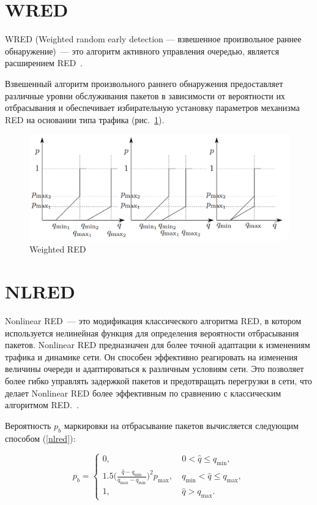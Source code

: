 \section{WRED}

WRED (Weighted random early detection --- взвешенное произвольное раннее
обнаружение)~--- это алгоритм активного управления очередью, является
расширением RED~\citep{WRED}.

Взвешенный алгоритм произвольного раннего обнаружения предоставляет
различные уровни обслуживания пакетов в зависимости от вероятности их
отбрасывания и обеспечивает избирательную установку параметров
механизма RED на основании типа трафика (рис.~\ref{fig:2.3}).

\begin{figure}[!h]
  \centering
  \includegraphics[width=0.7\linewidth]{image/wred.png}
  \caption{Weighted RED}
  \label{fig:2.3}
\end{figure}

\section{NLRED}

Nonlinear RED~--- это модификация классического алгоритма RED, в
котором используется нелинейная функция для определения
вероятности отбрасывания пакетов. Nonlinear RED предназначен для более точной адаптации к изменениям трафика и динамике сети. 
Он способен эффективно реагировать на изменения величины очереди и адаптироваться к различным условиям сети. 
Это позволяет более гибко управлять задержкой пакетов и предотвращать перегрузки в сети, 
что делает Nonlinear RED более эффективным по сравнению с классическим алгоритмом RED.~\citep{NLRED1,NLRED2}.   


Вероятность $p_{b}$ маркировки на
отбрасывание пакетов вычисляется следующим способом (\ref{nlred}):

\begin{equation}
\label{nlred}
p_{b} = \begin{cases}
        0, &  \ 0 < \hat{q} \leqslant q_{\min},
        \\
        1.5({\frac{\hat{q} - q_{\min}}{q_{\max} - q_{\min}})^2} {p_{\max}}, & \ q_{\min} < \hat{q} \leqslant q_{\max},
        \\
        1, &  \ \hat{q} > q_{\max}.
\end{cases}
\end{equation}

